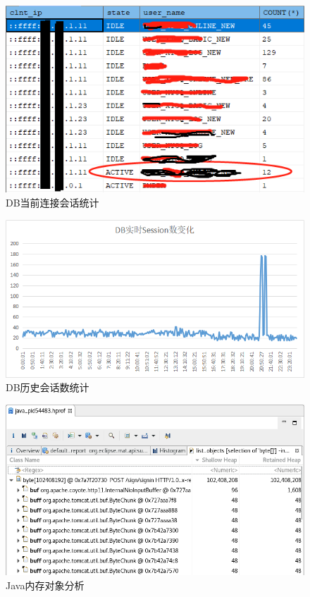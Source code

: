 \documentclass[8pt]{book}
\numberwithin{dummy}{section}
\theoremstyle{ocrenumbox}
\theoremstyle{blacknumex}
\theoremstyle{blacknumbox}
\theoremstyle{ocrenum}
\begin{document}
\begin{figure}[htbp]
	\centering
	\includegraphics[scale=0.6]{sessionstatistics.png}
	\caption{DB当前连接会话统计}
	\label{fig:sessionstatistics}
\end{figure}

\begin{figure}[htbp]
	\centering
	\includegraphics[scale=0.5]{dbsession.bmp}
	\caption{DB历史会话数统计}
	\label{fig:dbsession}
\end{figure}

\begin{figure}[htbp]
	\centering
	\includegraphics[scale=0.3]{javahprofanalysis.png}
	\caption{Java内存对象分析}
	\label{fig:javahprofanalysis}
\end{figure}
\end{document}
